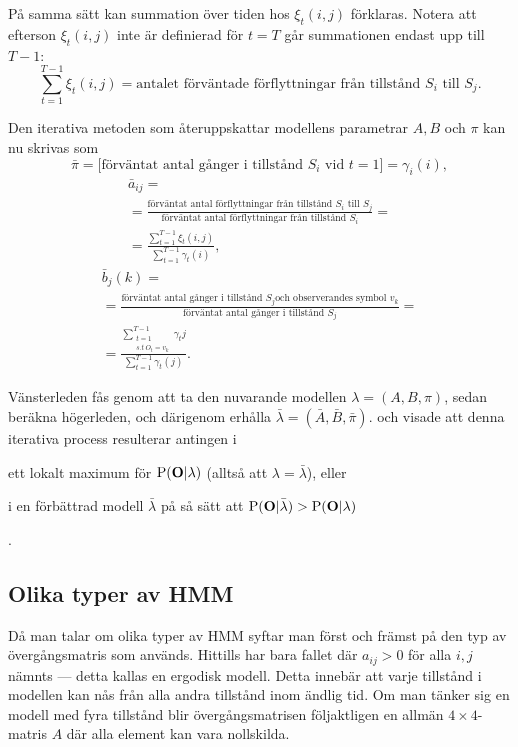 \documentclass[../rapport_MVEX01-11-05]{subfiles}
\begin{document}
På samma sätt kan summation över tiden hos  $\xi_t(i,j)$ förklaras.
Notera att efterson $\xi_t(i,j)$ inte är definierad för $t=T$ går summationen
endast upp till $T -1$:
\begin{equation*}
\sum_{t=1}^{T-1}\xi_t(i,j) = \text{antalet förväntade förflyttningar
  från tillstånd $S_i$ till $S_j$}.
\end{equation*}

Den iterativa metoden som återuppskattar modellens parametrar $A,B$
och $\pi$ kan nu skrivas som
\begin{equation*}
\bar{\pi} = \text{[förväntat antal gånger i tillstånd $S_i$ vid
  $t=1$]} = \gamma_i(i),
\end{equation*}
\begin{multline*}
\bar{a}_{ij} = \\ = \frac{\text{förväntat antal förflyttningar från
    tillstånd $S_i$ till $S_j$}}{\text{förväntat antal förflyttningar
    från tillstånd $S_i$}} = \\ =
\frac{\sum_{t=1}^{T-1}\xi_t(i,j)}{\sum_{t=1}^{T-1}\gamma_t(i)},
\end{multline*}
\begin{multline*}
\bar{b}_j(k) = \\ = \frac{\text{förväntat antal gånger i tillstånd $S_j$
    och observerandes symbol $v_k$}}{\text{förväntat antal gånger i
    tillstånd $S_j$}} = \\ = \frac{\sum_{\substack{t=1\\s.t~ O_t =
      v_k}}^{T-1}\gamma_t{j}}{\sum_{t=1}^{T-1}\gamma_t(j)}.
\end{multline*}

Vänsterleden fås genom att ta den nuvarande modellen $\lambda =
(A,B,\pi)$, sedan beräkna högerleden, och därigenom erhålla $\bar{\lambda} =
(\bar{A},\bar{B}, \bar{\pi})$.  och 
visade att denna iterativa process resulterar antingen i
\begin{inparaenum}
	\item ett lokalt maximum för $\mathrm{P}(\mathbf{O}|\lambda)$
  (alltså att $\lambda = \bar{\lambda}$), eller
 	\item i en förbättrad modell $\bar{\lambda}$ på så sätt att
  $\mathrm{P}(\mathbf{O}|\bar{\lambda}) > \mathrm{P}(\mathbf{O}|\lambda)$
\end{inparaenum}. 

\subsection{Olika typer av HMM}\label{sec:hmmtypes}
Då man talar om olika typer av HMM syftar man först och främst på
den typ av övergångsmatris som används. Hittills har bara 
fallet där $a_{ij} > 0$ för alla $i,j$ nämnts --- detta kallas en ergodisk
modell. Detta innebär att varje tillstånd i modellen
kan nås från alla andra tillstånd inom ändlig tid. Om man
tänker sig en modell med fyra tillstånd blir övergångsmatrisen
följaktligen en allmän $4\times 4$-matris $A$ där alla element kan vara nollskilda.
\end{document}
